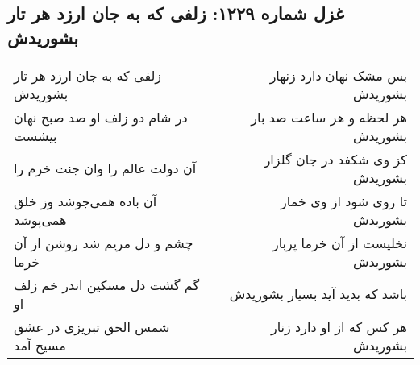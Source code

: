 \begin{center}
\section*{غزل شماره ۱۲۲۹: زلفی که به جان ارزد هر تار بشوریدش}
\label{sec:1229}
\begin{longtable}{l p{0.5cm} r}
زلفی که به جان ارزد هر تار بشوریدش
&&
بس مشک نهان دارد زنهار بشوریدش
\\
در شام دو زلف او صد صبح نهان بیشست
&&
هر لحظه و هر ساعت صد بار بشوریدش
\\
آن دولت عالم را وان جنت خرم را
&&
کز وی شکفد در جان گلزار بشوریدش
\\
آن باده همی‌جوشد وز خلق همی‌پوشد
&&
تا روی شود از وی خمار بشوریدش
\\
چشم و دل مریم شد روشن از آن خرما
&&
نخلیست از آن خرما پربار بشوریدش
\\
گم گشت دل مسکین اندر خم زلف او
&&
باشد که بدید آید بسیار بشوریدش
\\
شمس الحق تبریزی در عشق مسیح آمد
&&
هر کس که از او دارد زنار بشوریدش
\\
\end{longtable}
\end{center}
